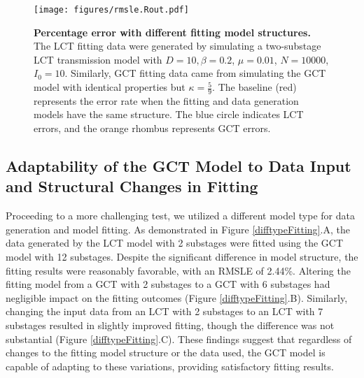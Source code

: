 \documentclass[12pt]{article}
\begin{document}
\begin{figure}[h!]
    \centering
    \texttt{[image: figures/rmsle.Rout.pdf]}
    \caption{\textbf{Percentage error with different fitting model structures.} \\ The LCT fitting data were generated by simulating a two-substage LCT transmission model with $D=10, \beta=0.2$, $\mu=0.01$, $N=10000$, $I_0=10$. Similarly, GCT fitting data came from simulating the GCT model with identical properties but $\kappa=\frac{5}{9}$. The baseline (red) represents the error rate when the fitting and data generation models have the same structure. The blue circle indicates LCT errors, and the orange rhombus represents GCT errors.}
    \label{rmsle}
\end{figure}


\subsection{Adaptability of the GCT Model to Data Input and Structural Changes in Fitting}
Proceeding to a more challenging test, we utilized a different model type for data generation and model fitting. As demonstrated in Figure \ref{difftypeFitting}.A, the data generated by the LCT model with 2 substages were fitted using the GCT model with 12 substages. Despite the significant difference in model structure, the fitting results were reasonably favorable, with an RMSLE of 2.44\%. Altering the fitting model from a GCT with 2 substages to a GCT with 6 substages had negligible impact on the fitting outcomes (Figure \ref{difftypeFitting}.B). Similarly, changing the input data from an LCT with 2 substages to an LCT with 7 substages resulted in slightly improved fitting, though the difference was not substantial (Figure \ref{difftypeFitting}.C). These findings suggest that regardless of changes to the fitting model structure or the data used, the GCT model is capable of adapting to these variations, providing satisfactory fitting results.
\end{document}
